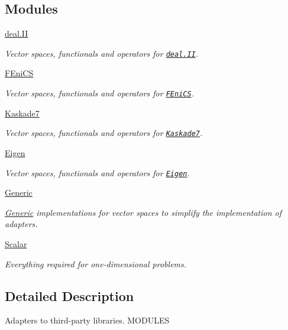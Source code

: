 \subsection*{\-Modules}
\begin{DoxyCompactItemize}
\item 
\hyperlink{group__dealIIGroup}{deal.\-I\-I}
\begin{DoxyCompactList}\small\item\em \-Vector spaces, functionals and operators for \href{http://www.dealii.org}{\tt deal.\-I\-I}. \end{DoxyCompactList}\item 
\hyperlink{group__FenicsGroup}{\-F\-Eni\-C\-S}
\begin{DoxyCompactList}\small\item\em \-Vector spaces, functionals and operators for \href{http://www.fenicsproject.org}{\tt \-F\-Eni\-C\-S}. \end{DoxyCompactList}\item 
\hyperlink{group__KaskadeGroup}{\-Kaskade7}
\begin{DoxyCompactList}\small\item\em \-Vector spaces, functionals and operators for \href{http://www.zib.de/projects/kaskade7-finite-element-toolbox}{\tt \-Kaskade7}. \end{DoxyCompactList}\item 
\hyperlink{group__EigenGroup}{\-Eigen}
\begin{DoxyCompactList}\small\item\em \-Vector spaces, functionals and operators for \href{http://eigen.tuxfamily.org}{\tt \-Eigen}. \end{DoxyCompactList}\item 
\hyperlink{group__GenericGroup}{\-Generic}
\begin{DoxyCompactList}\small\item\em \hyperlink{namespaceSpacy_1_1Generic}{\-Generic} implementations for vector spaces to simplify the implementation of adapters. \end{DoxyCompactList}\item 
\hyperlink{group__ScalarGroup}{\-Scalar}
\begin{DoxyCompactList}\small\item\em \-Everything required for one-\/dimensional problems. \end{DoxyCompactList}\end{DoxyCompactItemize}


\subsection{\-Detailed \-Description}
\-Adapters to third-\/party libraries. \-M\-O\-D\-U\-L\-E\-S 